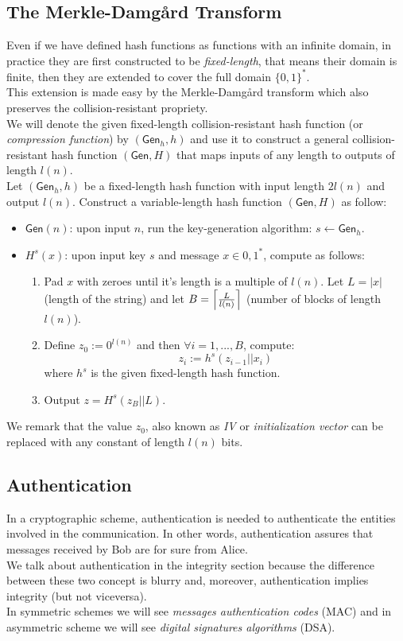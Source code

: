 \subsection{The Merkle-Damg\r{a}rd Transform}
Even if we have defined hash functions as functions with an infinite domain, in practice they are first constructed to be \emph{fixed-length}, that means their domain is finite, then they are extended to cover the full domain $\{0,1\}^{*}$.\\
This extension is made easy by the Merkle-Damg\r{a}rd transform which also preserves the collision-resistant propriety.\\
We will denote the given fixed-length collision-resistant hash function (or \emph{compression function}) by $(\mathsf{Gen}_h, h)$ and use it to construct a general collision-resistant hash function $(\mathsf{Gen}, H)$ that maps inputs of any length to outputs of length $l(n)$.\\
Let $(\mathsf{Gen}_h, h)$ be a fixed-length hash function with input length $2l(n)$ and output $l(n)$. Construct a variable-length hash function $(\mathsf{Gen}, H)$ as follow:
\begin{itemize}
    \item{$\mathsf{Gen}(n)$: upon input $n$, run the key-generation algorithm: $s \leftarrow \mathsf{Gen}_h$.}
    \item{$H^s(x)$: upon input key $s$ and message $x \in {0, 1}^{*}$, compute as follows:
        \begin{enumerate}
            \item{Pad $x$ with zeroes until it's length is a multiple of $l(n)$. Let $L = |x|$ (length of the string) and let $B = \ceil[\Big]{\frac{L}{l(n)}}$ (number of blocks of length $l(n)$).}
            \item{Define $z_0 := 0^{l(n)}$ and then $\forall i = 1,...,B$, compute:
                $$
                    z_i := h^s(z_{i-1}||x_i)
                $$
                where $h^s$ is the given fixed-length hash function.}
            \item{Output $z = H^s(z_B||L)$.}
        \end{enumerate}}
\end{itemize}
We remark that the value $z_0$, also known as \emph{IV} or \emph{initialization vector} can be replaced with any constant of length $l(n)$ bits.

\subsection{Authentication}
In a cryptographic scheme, authentication is needed to authenticate the entities involved in the communication. In other words, authentication assures that messages received by Bob are for sure from Alice.\\
We talk about authentication in the integrity section because the difference between these two concept is blurry and, moreover, authentication implies integrity (but not viceversa).\\
In symmetric schemes we will see \emph{messages authentication codes} (MAC) and in asymmetric scheme we will see \emph{digital signatures algorithms} (DSA).

